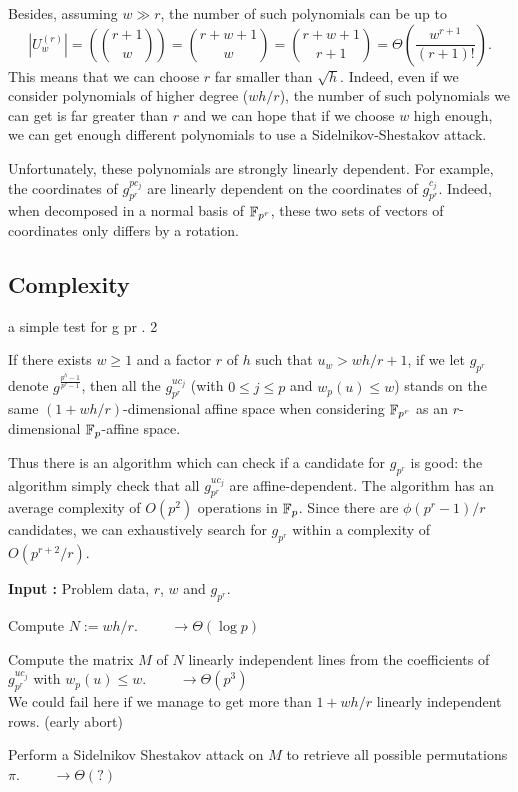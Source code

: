 \documentclass[a4paper]{article}
\newcommand{\GF}[1]{\F_{#1}}
\begin{document}
Besides, assuming $w \gg r$, the number of such polynomials can be up to
$$ | U_w^{(r)} | = \left( \binom{r+1}{w} \right) = \binom{r+w+1}{w} = \binom{r+w+1}{r+1} = \Theta\left(\frac{w^{r+1}}{(r+1)!}\right) .$$
This means that we can choose $r$ far smaller than $\sqrt{h}$. Indeed, even if we consider polynomials of higher degree ($wh/r$), the number of such polynomials we can get is far greater than $r$ and we can hope that if we choose $w$ high enough, we can get enough different polynomials to use a Sidelnikov-Shestakov attack.


Unfortunately, these polynomials are strongly linearly dependent.
For example, the coordinates of $g_{p^r}^{p c_j}$ are linearly dependent on the coordinates of $g_{p^r}^{c_j}$. Indeed, when decomposed in a normal basis of $\mathbb{F}_{p^r}$, these two sets of vectors of coordinates only differs by a rotation.


\subsection{Complexity}


a simple test for g pr .
2
\begin{theorem}
If there exists $w \geq 1$ and a factor $r$ of $h$ such that $u_w > wh/r + 1$, if we let $g_{p^r}$ denote $g^{\frac{p^h-1}{p^r-1}}$, then all the $g_{p^r}^{uc_j}$ (with $0 \leq j\leq p$ and $w_p(u) \leq w$) stands on the same $(1+wh/r)$-dimensional affine space when considering $\GF{p^r}$ as an $r$-dimensional $\GF{p}$-affine space.
\end{theorem}
Thus there is an algorithm which can check if a candidate for $g_{p^r}$ is good: the algorithm simply check that all $g_{p^r}^{uc_j}$ are affine-dependent. The algorithm has an average complexity of $O(p^2)$ operations in $\GF{p}$. Since there are $\phi(p^r-1)/r$ candidates, we can exhaustively search for $g_{p^r}$ within a complexity of $O(p^{r+2} /r)$.


\textbf{Input : } Problem data, $r$, $w$ and $g_{p^r}$.

Compute $N := w h / r$. \ \ \ \ $\rightarrow \Theta(\log p)$

Compute the matrix $M$ of $N$ linearly independent lines from the coefficients of $g_{p^r}^{uc_j}$ with $w_p(u) \leq w$. \ \ \ \ $\rightarrow \Theta(p^3)$\\
We could fail here if we manage to get more than $1+wh/r$ linearly independent rows. (early abort)

Perform a Sidelnikov Shestakov attack on $M$ to retrieve all possible permutations $\pi$. \ \ \ \ $\rightarrow \Theta( ? )$
\end{document}
